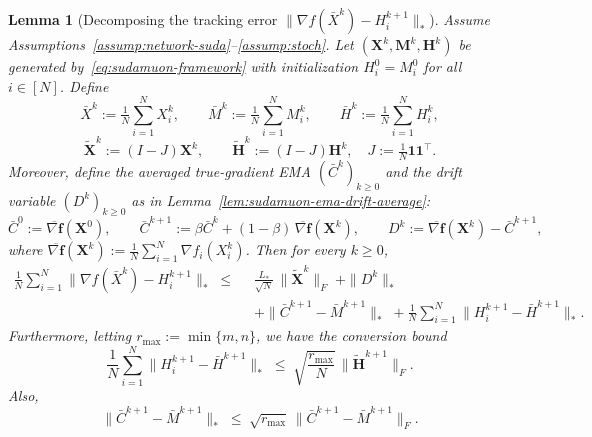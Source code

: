 \documentclass{article}
\newtheorem{lemma}{Lemma}
\begin{document}
\begin{lemma}[Decomposing the tracking error $\|\nabla f(\bar X^k)-H_i^{k+1}\|_*$]
\label{lem:sudamuon-tracking-error-decomp}
Assume Assumptions~\ref{assump:network-suda}--\ref{assump:stoch}.
Let $(\mathbf X^k,\mathbf M^k,\mathbf H^k)$ be generated by~\eqref{eq:sudamuon-framework} with initialization $H_i^0=M_i^0$ for all $i\in[N]$.
Define
\[
\bar X^k:=\tfrac{1}{N}\sum_{i=1}^N X_i^k,
\qquad
\bar M^k:=\tfrac{1}{N}\sum_{i=1}^N M_i^k,
\qquad
\bar H^k:=\tfrac{1}{N}\sum_{i=1}^N H_i^k,
\]
\[
\tilde{\mathbf X}^k := (I-J)\mathbf X^k,
\qquad
\tilde{\mathbf H}^k := (I-J)\mathbf H^k,\quad J:=\tfrac{1}{N}\mathbf 1\mathbf 1^\top.
\]
Moreover, define the averaged true-gradient EMA $(\bar C^k)_{k\ge 0}$ and the drift variable $(D^k)_{k\ge 0}$ as in Lemma~\ref{lem:sudamuon-ema-drift-average}:
\[
\bar C^{0}:=\overline{\nabla \mathbf f}(\mathbf X^0),
\qquad
\bar C^{k+1} := \beta\bar C^k+(1-\beta)\,\overline{\nabla \mathbf f}(\mathbf X^k),
\qquad
D^k := \overline{\nabla \mathbf f}(\mathbf X^k)-\bar C^{k+1},
\]
where $\overline{\nabla \mathbf f}(\mathbf X^k):=\tfrac{1}{N}\sum_{i=1}^N \nabla f_i(X_i^k)$.
Then for every $k\ge 0$,
\begin{equation}
\label{eq:tracking-error-average-bound}
\begin{split}
\frac{1}{N}\sum_{i=1}^N \|\nabla f(\bar X^k)-H_i^{k+1}\|_*
\;\le\;&\;
\frac{L_*}{\sqrt N}\,\|\tilde{\mathbf X}^k\|_F
\;+
\|D^k\|_*
\\&\;+
\|\bar C^{k+1}-\bar M^{k+1}\|_*
\;+
\frac{1}{N}\sum_{i=1}^N\|H_i^{k+1}-\bar H^{k+1}\|_*.
\end{split}
\end{equation}
Furthermore, letting $r_{\max}:=\min\{m,n\}$, we have the conversion bound
\begin{equation}
\label{eq:H-disagreement-nuc-vs-F}
\frac{1}{N}\sum_{i=1}^N\|H_i^{k+1}-\bar H^{k+1}\|_*
\;\le\; \sqrt{\frac{r_{\max}}{N}}\,\|\tilde{\mathbf H}^{k+1}\|_F.
\end{equation}
Also,
\begin{equation}
\label{eq:barC-barM-nuc-vs-F}
\|\bar C^{k+1}-\bar M^{k+1}\|_* \;\le\; \sqrt{r_{\max}}\,\|\bar C^{k+1}-\bar M^{k+1}\|_F.
\end{equation}
\end{lemma}
\end{document}
